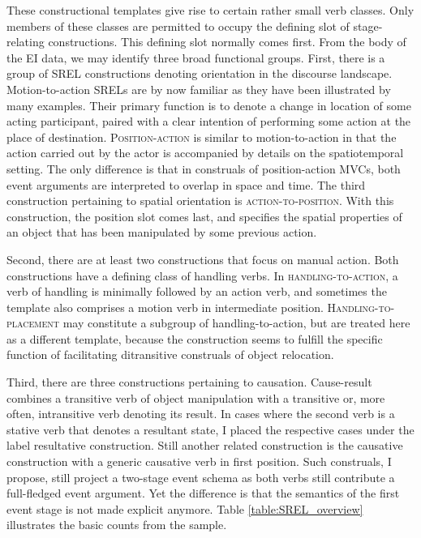 These constructional templates give rise to certain rather small verb classes. Only members of these classes are permitted to occupy the defining slot of stage-relating constructions. This defining slot normally comes first. From the body of the EI data, we may identify three broad functional groups. First, there is a group of SREL constructions denoting orientation in the discourse landscape. Motion-to-action SRELs are by now familiar as they have been illustrated by many examples. Their primary function is to denote a change in location of some acting participant, paired with a clear intention of performing some action at the place of destination. \textsc{Position-action} is similar to motion-to-action in that the action carried out by the actor is accompanied by details on the spatiotemporal setting. The only difference is that in construals of position-action MVCs, both event arguments are interpreted to overlap in space and time. The third construction pertaining to spatial orientation is \textsc{action-to-position}. With this construction, the position slot comes last, and specifies the spatial properties of an object that has been manipulated by some previous action. 

Second, there are at least two constructions that focus on manual action. Both constructions have a defining class of handling verbs. In \textsc{handling-to-action}, a verb of handling is minimally followed by an action verb, and sometimes the template also comprises a motion verb in intermediate position. \textsc{Handling-to-placement} may constitute a subgroup of handling-to-action, but are treated here as a different template, because the construction seems to fulfill the specific function of facilitating ditransitive construals of object relocation.

Third, there are three constructions pertaining to causation. Cause-result combines a transitive verb of object manipulation with a transitive or, more often, intransitive verb denoting its result. In cases where the second verb is a stative verb that denotes a resultant state, I placed the respective cases under the label resultative construction. Still another related construction is the causative construction with a generic causative verb in first position. Such construals, I propose, still project a two-stage event schema as both verbs still contribute a full-fledged event argument. Yet the difference is that the semantics of the first event stage is not made explicit anymore. Table \ref{table:SREL_overview} illustrates the basic counts from the sample.

